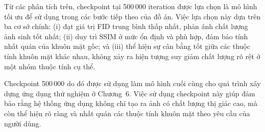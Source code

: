 \documentclass[../DoAn.tex]{subfiles}
\begin{document}
Từ các phân tích trên, checkpoint tại 500\,000 iteration được lựa chọn là mô hình tối ưu để sử dụng trong các bước tiếp theo của đồ án. Việc lựa chọn này dựa trên ba cơ sở chính: (i) đạt giá trị FID trung bình thấp nhất, phản ánh chất lượng ảnh sinh tốt nhất; (ii) duy trì SSIM ở mức ổn định và phù hợp, đảm bảo tính nhất quán của khuôn mặt gốc; và (iii) thể hiện sự cân bằng tốt giữa các thuộc tính khuôn mặt khác nhau, không xảy ra hiện tượng suy giảm chất lượng rõ rệt ở một nhóm thuộc tính cụ thể.

Checkpoint 500\,000 do đó được sử dụng làm mô hình cuối cùng cho quá trình xây dựng ứng dụng thử nghiệm ở Chương~6. Việc sử dụng checkpoint này giúp đảm bảo rằng hệ thống ứng dụng không chỉ tạo ra ảnh có chất lượng thị giác cao, mà còn thể hiện rõ ràng và nhất quán các thuộc tính khuôn mặt theo yêu cầu của người dùng.
\end{document}
